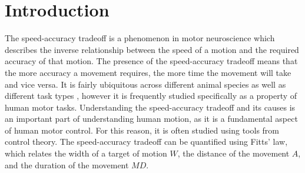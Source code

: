 \documentclass[letterpaper, 10pt, conference]{ieeeconf}
\begin{document}
\section{Introduction}

The speed-accuracy tradeoff is a phenomenon in motor neuroscience which describes the inverse relationship between the speed of a motion and the required accuracy of that motion.
The presence of the speed-accuracy tradeoff means that the more accuracy a movement requires, the more time the movement will take and vice versa.
It is fairly ubiquitous across different animal species as well as different task types \cite{zimmerman_book}, however it is frequently studied specifically as a property of human motor tasks. Understanding the speed-accuracy tradeoff and its causes is an important part of understanding human motion, as it is a fundamental aspect of human motor control. For this reason, it is often studied using tools from control theory.
The speed-accuracy tradeoff can be quantified using Fitts' law, which relates the width of a target of motion $W$, the distance of the movement $A$, and the duration of the movement $MD$. 
\end{document}
